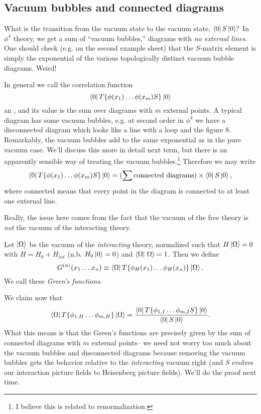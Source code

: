 \subsection*{Vacuum bubbles and connected diagrams} What is the transition from the vacuum state to the vacuum state, $\left< 0 \right|S\left| 0 \right>?$
In $\phi^4$ theory, we get a sum of ``vacuum bubbles,'' diagrams with \emph{no external lines}. One should check (e.g. on the second example sheet) that the $S$-matrix element is simply the exponential of the various topologically distinct vacuum bubble diagrams. Weird!%

In general we call the correlation function
$$\left< 0 \right|T\{\phi(x_1)\ldots \phi(x_m) S\}\left| 0 \right>$$
an , and its value is the sum over diagrams with $m$ external points. A typical diagram has some vacuum bubbles, e.g. at second order in $\phi^4$ we have a disconnected diagram which looks like a line with a loop and the figure 8. Remarkably, the vacuum bubbles add to the same exponential as in the pure vacuum case. We'll discuss this more in detail next term, but there is an apparently sensible way of treating the vacuum bubbles.\footnote{I believe this is related to renormalization.} Therefore we may write
$$\left< 0 \right|T\{\phi(x_1)\ldots \phi(x_m) S\}\left| 0 \right>=(\sum \text{connected diagrams})\times \left< 0 \right|S\left| 0 \right>,$$
where connected means that every point in the diagram is connected to at least one external line.

Really, the issue here comes from the fact that the vacuum of the free theory is \emph{not} the vacuum of the interacting theory. 
\begin{defn}
Let $\left| \Omega \right>$ be the vacuum of the \emph{interacting} theory, normalized such that
$H\left| \Omega \right>=0$ with $H=H_0+H_{int}$ (n.b. $H_0\left| 0 \right>=0$) and $\braket{\Omega}{\Omega}=1$. Then we define
$$G^{(n)}(x_1\ldots x_n)\equiv \left< \Omega \right|T\{\phi_H (x_1)\ldots \phi_H(x_n)\}\left| \Omega \right>.$$
We call these \emph{Green's functions}. 
\end{defn}
We claim now that
$$\left< \Omega \right|T\{\phi_{1,H}\ldots \phi_{m,H}\}\left| \Omega \right>=\frac{\left< 0 \right|T \{\phi_{1,I}\ldots \phi_{m,I}S\}\left| 0 \right>}{\left< 0 \right|S\left| 0 \right>}.$$
What this means is that the Green's functions are precisely given by the sum of connected diagrams with $m$ external points-- we need not worry too much about the vacuum bubbles and disconnected diagrams because removing the vacuum bubbles gets the behavior relative to the \emph{interacting} vacuum right (and $S$ evolves our interaction picture fields to Heisenberg picture fields). We'll do the proof next time.
